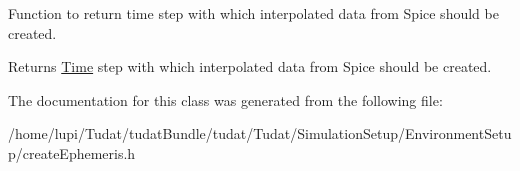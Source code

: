 Function to return time step with which interpolated data from Spice should be created. \begin{DoxyReturn}{Returns}
\hyperlink{classtudat_1_1Time}{Time} step with which interpolated data from Spice should be created. 
\end{DoxyReturn}


The documentation for this class was generated from the following file\+:\begin{DoxyCompactItemize}
\item 
/home/lupi/\+Tudat/tudat\+Bundle/tudat/\+Tudat/\+Simulation\+Setup/\+Environment\+Setup/create\+Ephemeris.\+h\end{DoxyCompactItemize}
